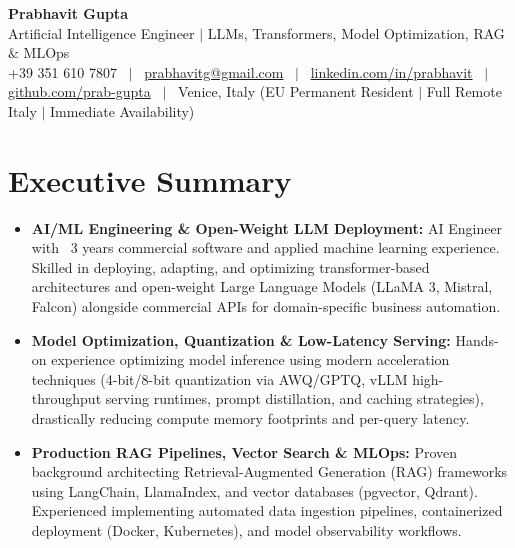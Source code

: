 \documentclass[a4paper,10pt]{article}
\begin{document}
\begin{minipage}[c]{0.80\textwidth}
  {\Huge\bfseries Prabhavit Gupta}\\[3pt]
  {\color{accent}\large Artificial Intelligence Engineer $\vert$ LLMs, Transformers, Model Optimization, RAG $\&$ MLOps}\\[6pt]
  {\footnotesize +39 351 610 7807 ~$\vert$~
  \href{mailto:prabhavitg@gmail.com}{prabhavitg@gmail.com} ~$\vert$~
  \href{https://www.linkedin.com/in/prabhavit/}{linkedin.com/in/prabhavit} ~$\vert$~
  \href{https://github.com/prab-gupta}{github.com/prab-gupta} ~$\vert$~
  Venice, Italy (EU Permanent Resident $\vert$ Full Remote Italy $\vert$ Immediate Availability)}
\end{minipage}\hfill

\vspace{6pt}

\section{Executive Summary}
\begin{itemize}
  \item \textbf{AI/ML Engineering \& Open-Weight LLM Deployment:} AI Engineer with ~3 years commercial software and applied machine learning experience. Skilled in deploying, adapting, and optimizing transformer-based architectures and open-weight Large Language Models (LLaMA 3, Mistral, Falcon) alongside commercial APIs for domain-specific business automation.
  \item \textbf{Model Optimization, Quantization \& Low-Latency Serving:} Hands-on experience optimizing model inference using modern acceleration techniques (4-bit/8-bit quantization via AWQ/GPTQ, vLLM high-throughput serving runtimes, prompt distillation, and caching strategies), drastically reducing compute memory footprints and per-query latency.
  \item \textbf{Production RAG Pipelines, Vector Search \& MLOps:} Proven background architecting Retrieval-Augmented Generation (RAG) frameworks using LangChain, LlamaIndex, and vector databases (pgvector, Qdrant). Experienced implementing automated data ingestion pipelines, containerized deployment (Docker, Kubernetes), and model observability workflows.
\end{itemize}

\end{document}
